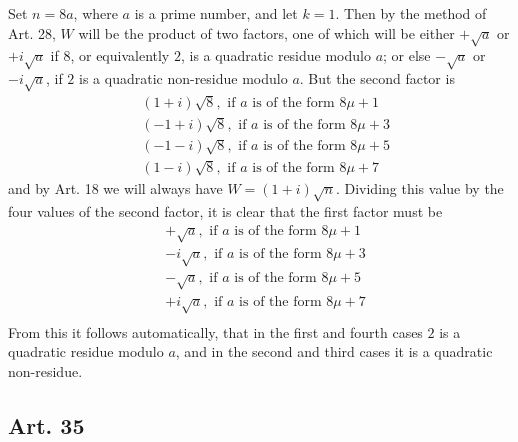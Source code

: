 \documentclass{book}
\theoremstyle{plain}
\theoremstyle{remark}
\begin{document}
Set $n = 8a$, where $a$ is a prime number, and let $k=1$.  Then by the method of Art. 28, $W$ will be the product of two factors, one of which will be either $+\sqrt{a}$ or $+i\sqrt{a}$ if $8$, or equivalently $2$, is a quadratic residue modulo $a$; or else $-\sqrt{a}$ or $-i\sqrt{a}$, if $2$ is a quadratic non-residue modulo $a$.  But the second factor is 
\begin{align*}
&(1+i)\sqrt{8}, \textrm{ if }a\textrm{ is of the form }8\mu+1 \\
&(-1+i)\sqrt{8}, \textrm{ if }a\textrm{ is of the form }8\mu+3 \\
&(-1-i)\sqrt{8}, \textrm{ if }a\textrm{ is of the form }8\mu+5 \\
&(1-i)\sqrt{8}, \textrm{ if }a\textrm{ is of the form }8\mu+7 
\end{align*}
and by Art. 18 we will always have $W = (1+i)\sqrt{n}$.  Dividing this value by the four values of the second factor, it is clear that the first factor must be 
\begin{align*} 
&+\sqrt{a}, \textrm{ if } a \textrm{ is of the form }8\mu+1 \\
&-i\sqrt{a}, \textrm{ if } a \textrm{ is of the form }8\mu+3 \\
&-\sqrt{a}, \textrm{ if } a \textrm{ is of the form }8\mu+5 \\
&+i\sqrt{a}, \textrm{ if } a \textrm{ is of the form }8\mu+7 \\
\end{align*}
From this it follows automatically, that in the first and fourth cases $2$ is a quadratic residue modulo $a$, and in the second and third cases it is a quadratic non-residue. 

\subsection*{Art. 35}
\end{document}
